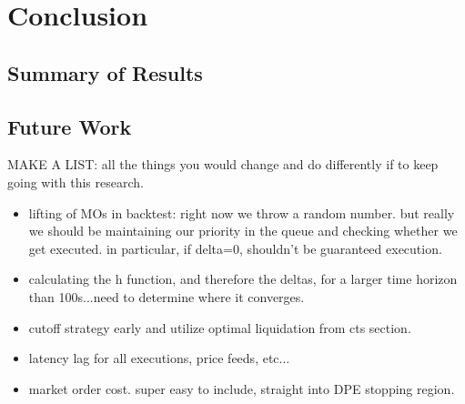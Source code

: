 \chapter{Conclusion}

\section{Summary of Results}

\section{Future Work}
MAKE A LIST: all the things you would change and do differently if to keep going with this research.
\begin{itemize}
\item lifting of MOs in backtest: right now we throw a random number. but really we should be maintaining our priority in the queue and checking whether we get executed. in particular, if delta=0, shouldn't be guaranteed execution.
\item calculating the h function, and therefore the deltas, for a larger time horizon than 100s...need to determine where it converges.
\item cutoff strategy early and utilize optimal liquidation from cts section.
\item latency lag for all executions, price feeds, etc...
\item market order cost. super easy to include, straight into DPE stopping region.
\end{itemize}
